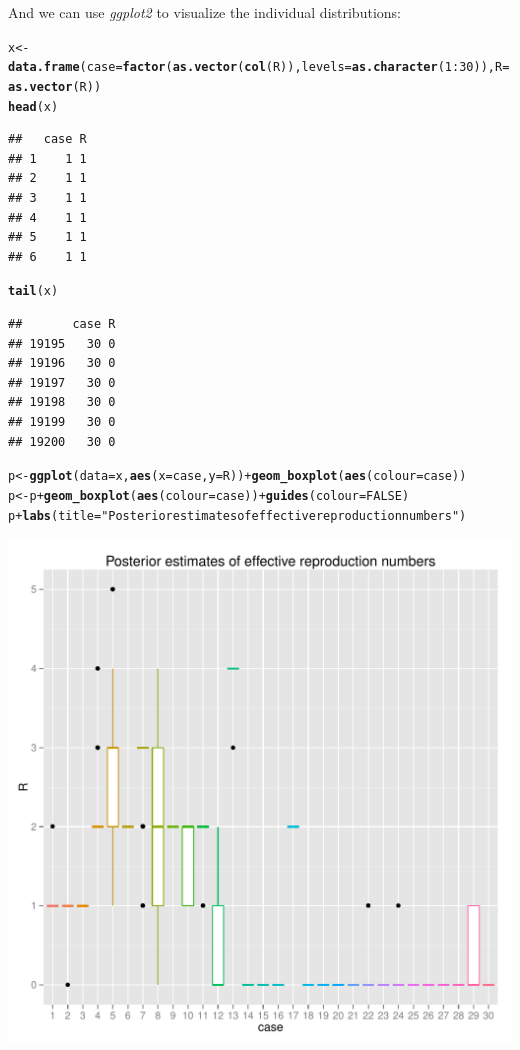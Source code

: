 \documentclass{article}\usepackage[]{graphicx}\usepackage[]{color}
\makeatletter
\newcommand{\hlnum}[1]{\textcolor[rgb]{0.686,0.059,0.569}{#1}}%
\newcommand{\hlstr}[1]{\textcolor[rgb]{0.192,0.494,0.8}{#1}}%
\newcommand{\hlopt}[1]{\textcolor[rgb]{0,0,0}{#1}}%
\newcommand{\hlstd}[1]{\textcolor[rgb]{0.345,0.345,0.345}{#1}}%
\newcommand{\hlkwb}[1]{\textcolor[rgb]{0.69,0.353,0.396}{#1}}%
\newcommand{\hlkwc}[1]{\textcolor[rgb]{0.333,0.667,0.333}{#1}}%
\newcommand{\hlkwd}[1]{\textcolor[rgb]{0.737,0.353,0.396}{\textbf{#1}}}%
\newenvironment{kframe}{%
 \def\at@end@of@kframe{}%
 \ifinner\ifhmode%
  \def\at@end@of@kframe{\end{minipage}}%
  \begin{minipage}{\columnwidth}%
 \fi\fi%
 \def\FrameCommand##1{\hskip\@totalleftmargin \hskip-\fboxsep
 \colorbox{shadecolor}{##1}\hskip-\fboxsep
     \hskip-\linewidth \hskip-\@totalleftmargin \hskip\columnwidth}%
 \MakeFramed {\advance\hsize-\width
   \@totalleftmargin\z@ \linewidth\hsize
   \@setminipage}}%
 {\par\unskip\endMakeFramed%
 \at@end@of@kframe}
\newenvironment{knitrout}{}{} %
\makeatother
\begin{document}
And we can use \textit{ggplot2} to visualize the individual distributions:
\begin{knitrout}
\color{fgcolor}\begin{kframe}
\begin{alltt}
\hlstd{x} \hlkwb{<-} \hlkwd{data.frame}\hlstd{(}\hlkwc{case}\hlstd{=}\hlkwd{factor}\hlstd{(}\hlkwd{as.vector}\hlstd{(}\hlkwd{col}\hlstd{(R)),} \hlkwc{levels}\hlstd{=}\hlkwd{as.character}\hlstd{(}\hlnum{1}\hlopt{:}\hlnum{30}\hlstd{)),}\hlkwc{R}\hlstd{=}\hlkwd{as.vector}\hlstd{(R))}
\hlkwd{head}\hlstd{(x)}
\end{alltt}
\begin{verbatim}
##   case R
## 1    1 1
## 2    1 1
## 3    1 1
## 4    1 1
## 5    1 1
## 6    1 1
\end{verbatim}
\begin{alltt}
\hlkwd{tail}\hlstd{(x)}
\end{alltt}
\begin{verbatim}
##       case R
## 19195   30 0
## 19196   30 0
## 19197   30 0
## 19198   30 0
## 19199   30 0
## 19200   30 0
\end{verbatim}
\begin{alltt}
\hlstd{p} \hlkwb{<-} \hlkwd{ggplot}\hlstd{(}\hlkwc{data}\hlstd{=x,} \hlkwd{aes}\hlstd{(}\hlkwc{x}\hlstd{=case,} \hlkwc{y}\hlstd{=R))} \hlopt{+} \hlkwd{geom_boxplot}\hlstd{(}\hlkwd{aes}\hlstd{(}\hlkwc{colour}\hlstd{=case))}
\hlstd{p} \hlkwb{<-} \hlstd{p} \hlopt{+} \hlkwd{geom_boxplot}\hlstd{(}\hlkwd{aes}\hlstd{(}\hlkwc{colour}\hlstd{=case))} \hlopt{+} \hlkwd{guides}\hlstd{(}\hlkwc{colour}\hlstd{=}\hlnum{FALSE}\hlstd{)}
\hlstd{p} \hlopt{+} \hlkwd{labs}\hlstd{(}\hlkwc{title}\hlstd{=}\hlstr{"Posterior estimates of effective reproduction numbers"}\hlstd{)}
\end{alltt}
\end{kframe}

{\centering \includegraphics[width=.6\textwidth]{figs/unnamed-chunk-55} 

}



\end{knitrout}
\end{document}
